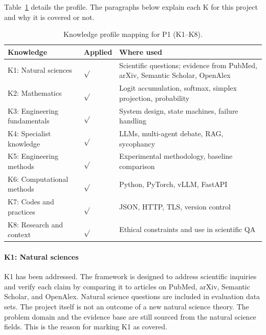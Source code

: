Table~\ref{tab:knowledge} details the profile. The paragraphs below explain
each K for this project and why it is covered or not.

\begin{center}
    \begin{table}[ht]
        \centering
        \caption{Knowledge profile mapping for P1 (K1--K8).}
        \renewcommand{\arraystretch}{1.6}
        \begin{tabular}{|p{}|p{}|p{}|}
            \hline
            Knowledge                    & Applied   & Where used                                                                    \\
            \hline
            K1: Natural sciences         & $\sqrt{}$ & Scientific questions; evidence from PubMed, arXiv, Semantic Scholar, OpenAlex \\
            \hline
            K2: Mathematics              & $\sqrt{}$ & Logit accumulation, softmax, simplex projection, probability                    \\
            \hline
            K3: Engineering fundamentals & $\sqrt{}$ & System design, state machines, failure handling                               \\
            \hline
            K4: Specialist knowledge     & $\sqrt{}$ & LLMs, multi-agent debate, RAG, sycophancy                                     \\
            \hline
            K5: Engineering methods      & $\sqrt{}$ & Experimental methodology, baseline comparison                                 \\
            \hline
            K6: Computational methods    & $\sqrt{}$ & Python, PyTorch, vLLM, FastAPI                                                \\
            \hline
            K7: Codes and practices      & $\sqrt{}$ & JSON, HTTP, TLS, version control                                              \\
            \hline
            K8: Research and context     & $\sqrt{}$ & Ethical constraints and use in scientific QA                                  \\
            \hline
        \end{tabular}
        \label{tab:knowledge}
    \end{table}
\end{center}

\paragraph{K1: Natural sciences} K1 has been addressed. The framework is designed to address scientific inquiries and verify each claim by comparing it to articles on PubMed, arXiv, Semantic Scholar, and OpenAlex. Natural science questions are included in evaluation data sets. The project itself is not an outcome of a new natural science theory. The problem domain and the evidence base are still sourced from the natural science fields. This is the reason for marking K1 as covered.

